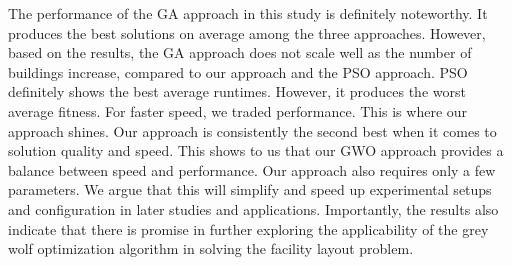The performance of the GA approach in this study is definitely noteworthy. It produces the best solutions on average among the three approaches. However, based on the results, the GA approach does not scale well as the number of buildings increase, compared to our approach and the PSO approach. PSO definitely shows the best average runtimes. However, it produces the worst average fitness. For faster speed, we traded performance. This is where our approach shines. Our approach is consistently the second best when it comes to solution quality and speed. This shows to us that our GWO approach provides a balance between speed and performance. Our approach also requires only a few parameters. We argue that this will simplify and speed up experimental setups and configuration in later studies and applications. Importantly, the results also indicate that there is promise in further exploring the applicability of the grey wolf optimization algorithm in solving the facility layout problem.
